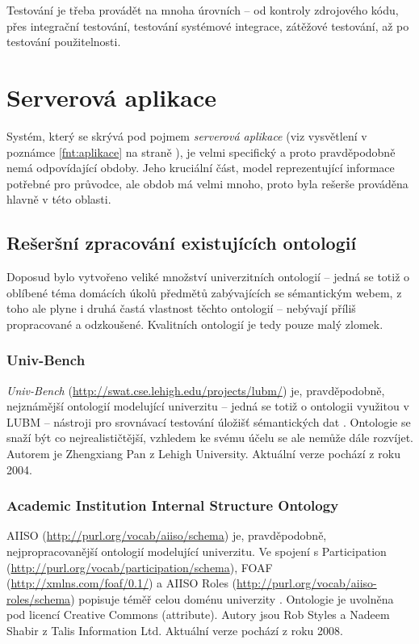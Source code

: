 Testování je třeba provádět na mnoha úrovních -- od kontroly zdrojového kódu, přes integrační testování, testování systémové integrace, zátěžové testování, až po testování použitelnosti.


\section{Serverová aplikace}
Systém, který se skrývá pod pojmem \textit{serverová aplikace} (viz vysvětlení v poznámce \ref{fnt:aplikace} na straně \pageref{fnt:aplikace}), je velmi specifický a proto pravděpodobně nemá odpovídající obdoby. Jeho kruciální část, model reprezentující informace potřebné pro průvodce, ale obdob má velmi mnoho, proto byla rešerše prováděna hlavně v této oblasti.

\subsection{Rešeršní zpracování existujících ontologií}
Doposud bylo vytvořeno veliké množství univerzitních ontologií -- jedná se totiž o oblíbené téma domácích úkolů předmětů zabývajících se sémantickým webem, z toho ale plyne i druhá častá vlastnost těchto ontologií -- nebývají příliš propracované a odzkoušené. Kvalitních ontologií je tedy pouze malý zlomek.

\subsubsection{Univ-Bench}
\label{sec:ontol:lubm}
\emph{Univ-Bench} (\url{http://swat.cse.lehigh.edu/projects/lubm/}) je, pravděpodobně, nejznámější ontologií modelující univerzitu -- jedná se totiž o ontologii využitou v \gls{LUBM} -- nástroji pro srovnávací testování úložišť sémantických dat \cite{Lubm}. Ontologie se snaží být co nejrealističtější, vzhledem ke svému účelu se ale nemůže dále rozvíjet. Autorem je Zhengxiang Pan z Lehigh University. Aktuální verze pochází z roku 2004.

\subsubsection{Academic Institution Internal Structure Ontology}
\Gls{AIISO} (\url{http://purl.org/vocab/aiiso/schema}) je, pravděpodobně, nejpropracovanější ontologií modelující univerzitu. Ve spojení s Participation (\url{http://purl.org/vocab/participation/schema}), \gls{FOAF} (\url{http://xmlns.com/foaf/0.1/}) a \gls{AIISO} Roles (\url{http://purl.org/vocab/aiiso-roles/schema}) popisuje téměř celou doménu univerzity \cite{Aiiso}. Ontologie je uvolněna pod licencí Creative Commons (attribute). Autory jsou Rob Styles a Nadeem Shabir z Talis Information Ltd. Aktuální verze pochází z roku 2008.

